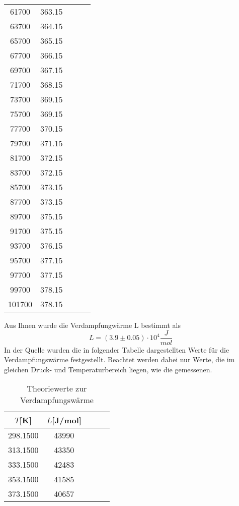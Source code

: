 \begin{table}[H]
\begin{tabular}{c c c c c}
      61700 &   363.15 \\ 
      63700 &   364.15 \\ 
      65700 &   365.15 \\ 
      67700 &   366.15 \\ 
      69700 &   367.15 \\ 
      71700 &   368.15 \\ 
      73700 &   369.15 \\ 
      75700 &   369.15 \\ 
      77700 &   370.15 \\ 
      79700 &   371.15 \\ 
      81700 &   372.15 \\ 
      83700 &   372.15 \\ 
      85700 &   373.15 \\ 
      87700 &   373.15 \\
      89700 &   375.15 \\ 
      91700 &   375.15 \\ 
      93700 &   376.15 \\ 
      95700 &   377.15 \\ 
      97700 &   377.15 \\ 
      99700 &   378.15 \\ 
      101700 &   378.15 \\ 
    \bottomrule
    \end{tabular}
\end{table}
Aus Ihnen wurde die Verdampfungwärme L bestimmt als 
\begin{equation*}
    L= (3.9 \pm 0.05) \cdot 10^4 \dfrac{J}{mol}
\end{equation*}
In der Quelle \cite{Verdampfungwärme} wurden die in folgender Tabelle dargestellten Werte
für die Verdampfungswärme festgestellt. Beachtet werden dabei nur Werte, die im gleichen 
Druck- und Temperaturbereich liegen, wie die gemessenen.
\begin{table}[H]
\centering
   \caption{Theoriewerte zur Verdampfungswärme}
   \label{tab:data}
   \begin{tabular}{c c c c c}
   \toprule
    $T$[K] & $L$[J/mol] \\
    \midrule
    298.1500 &    43990 \\ 
    313.1500 &    43350 \\   
    333.1500 &    42483 \\   
    353.1500 &    41585 \\   
    373.1500 &    40657 \\   
    \bottomrule
    \end{tabular}
\end{table}
